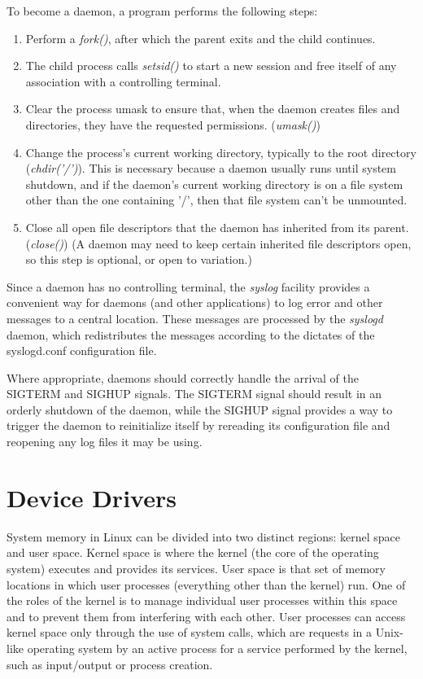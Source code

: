 To become a daemon, a program performs the following steps:
\begin{enumerate}
	\item Perform a \textit{fork()}, after which the parent exits and the child continues.
	\item The  child  process  calls  \textit{setsid()} to  start  a  new  session  and  free itself of any association with a controlling terminal.
	\item Clear the process umask to ensure that, when the daemon creates files and directories, they have the requested permissions. (\textit{umask()})
	\item Change the process’s current working directory, typically to the root directory (\textit{chdir('/')}). This is necessary because a daemon usually runs until system shutdown, and if the daemon’s current working directory is on a file system other than the one containing '/', then that file system can’t be unmounted.
	\item Close  all  open file descriptors that the daemon has inherited  from its parent. (\textit{close()}) (A  daemon  may  need  to  keep  certain  inherited  file  descriptors  open,  so  this step  is  optional,  or  open  to  variation.)
\end{enumerate}

Since a daemon has no controlling terminal, the  \textit{syslog}  facility  provides  a  convenient  way  for  daemons  (and  other  applications)  to  log  error  and  other  messages  to  a  central  location.  These  messages  are processed by the \textit{syslogd} daemon, which redistributes the messages according to the dictates  of  the  syslogd.conf  configuration  file. 

Where appropriate, daemons should correctly handle the arrival of the SIGTERM and SIGHUP  signals. The  SIGTERM signal  should  result  in  an  orderly  shutdown  of  the daemon, while the SIGHUP signal provides a way to trigger the daemon to reinitialize itself by rereading its configuration file and reopening any log files it may be using.

\clearpage
\section{Device Drivers}
System memory in Linux can be divided into two distinct regions: kernel space and user space. Kernel space is where the kernel (the core of the operating system) executes and provides its services. User space is that set of memory locations in which user processes (everything other than the kernel) run. One of the roles of the kernel is to manage individual user processes within this space and to prevent them from interfering with each other. User processes can access kernel space only through the use of system calls, which are requests in a Unix-like operating system by an active process for a service performed by the kernel, such as input/output or process creation. \cite{kernel_space}

